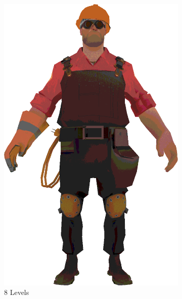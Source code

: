 \begin{figure}[h]
\begin{subfigure}[b]{0.16\textwidth}
        \includegraphics[width=\textwidth]{img/textures/CelShadeTexture8.png}
        \caption{8 Levels}
        \label{fig:CelShadeTexture8}
    \end{subfigure}
    ~
    \begin{subfigure}[b]{0.18\textwidth}

\end{subfigure}
\end{figure}

